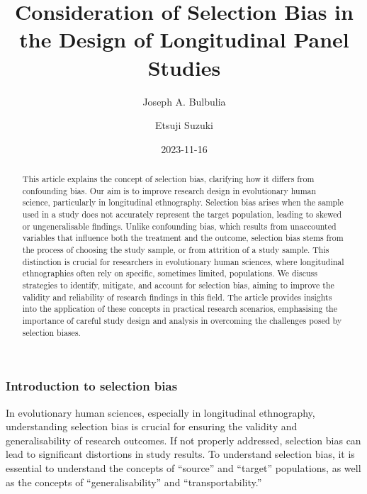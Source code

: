 \documentclass[
  singlecolumn,
  9pt]{article}
\title{Consideration of Selection Bias in the Design of Longitudinal
Panel Studies}
\author{Joseph A. Bulbulia}
\affil{%
                  Victoria University of Wellington, New Zealand
              }
\author{Etsuji Suzuki}
\date{2023-11-16}
\begin{document}
\maketitle
\begin{abstract}
This article explains the concept of selection bias, clarifying how it
differs from confounding bias. Our aim is to improve research design in
evolutionary human science, particularly in longitudinal ethnography.
Selection bias arises when the sample used in a study does not
accurately represent the target population, leading to skewed or
ungeneralisable findings. Unlike confounding bias, which results from
unaccounted variables that influence both the treatment and the outcome,
selection bias stems from the process of choosing the study sample, or
from attrition of a study sample. This distinction is crucial for
researchers in evolutionary human sciences, where longitudinal
ethnographies often rely on specific, sometimes limited, populations. We
discuss strategies to identify, mitigate, and account for selection
bias, aiming to improve the validity and reliability of research
findings in this field. The article provides insights into the
application of these concepts in practical research scenarios,
emphasising the importance of careful study design and analysis in
overcoming the challenges posed by selection biases.
\end{abstract}
\subsubsection{Introduction to selection
bias}\label{introduction-to-selection-bias}

In evolutionary human sciences, especially in longitudinal ethnography,
understanding selection bias is crucial for ensuring the validity and
generalisability of research outcomes. If not properly addressed,
selection bias can lead to significant distortions in study results. To
understand selection bias, it is essential to understand the concepts of
``source'' and ``target'' populations, as well as the concepts of
``generalisability'' and ``transportability.''
\end{document}
